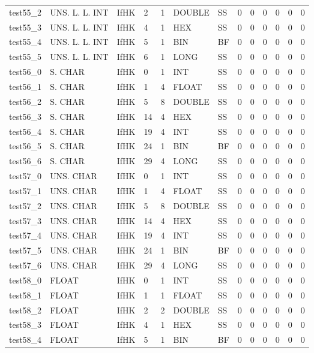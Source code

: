 \begin{longtable}{|l|l|l|p{0.5cm}|p{0.5cm}|l|p{0.5cm}|p{0.5cm}|p{0.5cm}|l|l|p{0.5cm}|l|}
test55\_2 & UNS. L. L. INT & IfHK & 2 & 1 & DOUBLE & SS & 0 & 0 & 0 & 0 & 0 & 0 \\
test55\_3 & UNS. L. L. INT & IfHK & 4 & 1 & HEX & SS & 0 & 0 & 0 & 0 & 0 & 0 \\
test55\_4 & UNS. L. L. INT & IfHK & 5 & 1 & BIN & BF & 0 & 0 & 0 & 0 & 0 & 0 \\
test55\_5 & UNS. L. L. INT & IfHK & 6 & 1 & LONG & SS & 0 & 0 & 0 & 0 & 0 & 0 \\
test56\_0 & S. CHAR & IfHK & 0 & 1 & INT & SS & 0 & 0 & 0 & 0 & 0 & 0 \\
test56\_1 & S. CHAR & IfHK & 1 & 4 & FLOAT & SS & 0 & 0 & 0 & 0 & 0 & 0 \\
test56\_2 & S. CHAR & IfHK & 5 & 8 & DOUBLE & SS & 0 & 0 & 0 & 0 & 0 & 0 \\
test56\_3 & S. CHAR & IfHK & 14 & 4 & HEX & SS & 0 & 0 & 0 & 0 & 0 & 0 \\
test56\_4 & S. CHAR & IfHK & 19 & 4 & INT & SS & 0 & 0 & 0 & 0 & 0 & 0 \\
test56\_5 & S. CHAR & IfHK & 24 & 1 & BIN & BF & 0 & 0 & 0 & 0 & 0 & 0 \\
test56\_6 & S. CHAR & IfHK & 29 & 4 & LONG & SS & 0 & 0 & 0 & 0 & 0 & 0 \\
test57\_0 & UNS. CHAR & IfHK & 0 & 1 & INT & SS & 0 & 0 & 0 & 0 & 0 & 0 \\
test57\_1 & UNS. CHAR & IfHK & 1 & 4 & FLOAT & SS & 0 & 0 & 0 & 0 & 0 & 0 \\
test57\_2 & UNS. CHAR & IfHK & 5 & 8 & DOUBLE & SS & 0 & 0 & 0 & 0 & 0 & 0 \\
test57\_3 & UNS. CHAR & IfHK & 14 & 4 & HEX & SS & 0 & 0 & 0 & 0 & 0 & 0 \\
test57\_4 & UNS. CHAR & IfHK & 19 & 4 & INT & SS & 0 & 0 & 0 & 0 & 0 & 0 \\
test57\_5 & UNS. CHAR & IfHK & 24 & 1 & BIN & BF & 0 & 0 & 0 & 0 & 0 & 0 \\
test57\_6 & UNS. CHAR & IfHK & 29 & 4 & LONG & SS & 0 & 0 & 0 & 0 & 0 & 0 \\
test58\_0 & FLOAT & IfHK & 0 & 1 & INT & SS & 0 & 0 & 0 & 0 & 0 & 0 \\
test58\_1 & FLOAT & IfHK & 1 & 1 & FLOAT & SS & 0 & 0 & 0 & 0 & 0 & 0 \\
test58\_2 & FLOAT & IfHK & 2 & 2 & DOUBLE & SS & 0 & 0 & 0 & 0 & 0 & 0 \\
test58\_3 & FLOAT & IfHK & 4 & 1 & HEX & SS & 0 & 0 & 0 & 0 & 0 & 0 \\
test58\_4 & FLOAT & IfHK & 5 & 1 & BIN & BF & 0 & 0 & 0 & 0 & 0 & 0 \\

\end{longtable}
